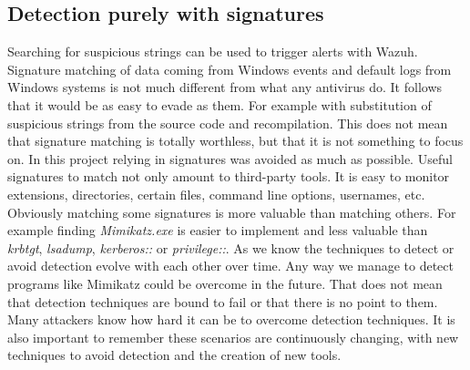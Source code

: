 \subsection{Detection purely with signatures}
Searching for suspicious strings can be used to trigger alerts with Wazuh.
Signature matching of data coming from Windows events and default logs from Windows systems is not much different from what any antivirus do. It follows that it would be as easy to evade as them. For example with substitution of suspicious strings from the source code and recompilation\cite{understanding_powersploit_mimikatz}.
\linej
\linej
This does not mean that signature matching is totally worthless, but that it is not something to focus on. In this project relying in signatures was avoided as much as possible.
Useful signatures to match not only amount to third-party tools. It is easy to monitor extensions, directories, certain files, command line options, usernames, etc.
\linej
Obviously matching some signatures is more valuable than matching others. For example finding \textit{Mimikatz.exe} is easier to implement and less valuable than \textit{krbtgt}, \textit{lsadump}, \textit{kerberos::} or \textit{privilege::}.
\linej
\linej
As we know the techniques to detect or avoid detection evolve with each other over time.
Any way we manage to detect programs like Mimikatz could be overcome in the future.
\linej
That does not mean that detection techniques are bound to fail or that there is no point to them.
Many attackers know how hard it can be to overcome detection techniques.
\linej
It is also important to remember these scenarios are continuously changing, with new techniques to avoid detection and the creation of new tools.

